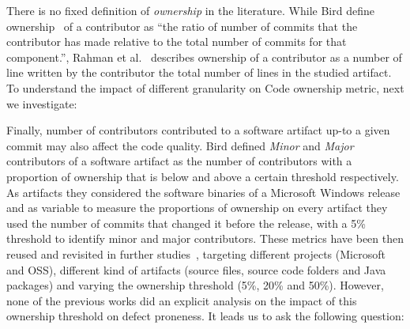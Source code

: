 There is no fixed definition of {\em ownership} in the literature. While Bird
\etal define ownership~\cite{bird:original} of a contributor as ``the ratio of
number of commits that the contributor has made relative to the total
number of commits for that component.'', Rahman et al.~\cite{Rahman:blame}
describes ownership of a contributor as a number of line written by the
contributor \wrt the total number of lines in the studied artifact. To
understand the impact of different granularity on Code ownership metric, next
we investigate: 


Finally, number of contributors contributed to a software artifact up-to a
given commit may also affect the code quality. Bird \etal defined
\textit{Minor} and \textit{Major} contributors of a software artifact as the
number of contributors with a proportion of ownership that is below and above a
certain threshold respectively. As artifacts they considered the software
binaries of a Microsoft Windows release and as variable to measure the
proportions of ownership on every artifact they used the number of commits that
changed it before the release, with a 5\% threshold to identify minor and major
contributors.
These metrics have been then reused and revisited in further
studies~\cite{Foucault:oss, Greiler:replication}, targeting different projects
(Microsoft and OSS), different kind of artifacts (source files, source code
folders and Java packages) and varying the ownership threshold (5\%, 20\% and
50\%). However, none of the previous works did an explicit analysis on the
impact of this ownership threshold on defect proneness. It leads us to ask the
following question:

